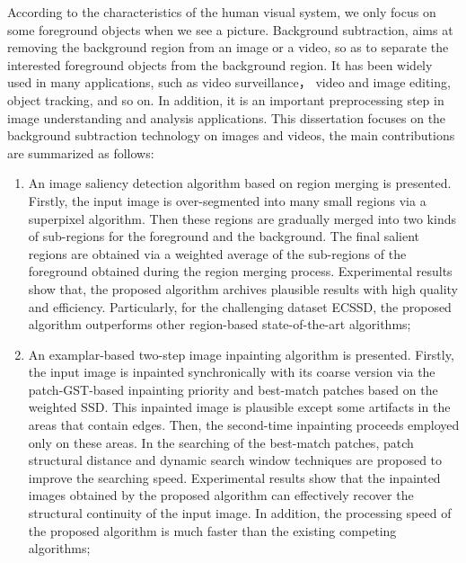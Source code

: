 \begin{eabstract}
   According to the characteristics of the human visual system, we only focus on some foreground objects when we see a picture. Background subtraction, aims at removing the background region from an image or a video, so as to separate the interested foreground objects from the background region. It has been widely used in many applications, such as video surveillance， video and image editing, object tracking, and so on. In addition, it is an important preprocessing step in image  understanding and analysis applications. This dissertation focuses on the background subtraction technology on images and videos, the main contributions are summarized as follows:
   \begin{enumerate}
   \item An image saliency detection algorithm based on region merging is presented. Firstly, the input image is over-segmented into many small regions via a superpixel algorithm. Then these regions are gradually merged into two kinds of sub-regions for the foreground and the background. The final salient regions are obtained via a weighted average of the sub-regions of the  foreground obtained during the region merging process. Experimental results show that, the proposed algorithm archives plausible results with high quality and efficiency. Particularly, for the challenging dataset ECSSD, the proposed algorithm outperforms other region-based state-of-the-art algorithms;
   \item An examplar-based two-step image inpainting algorithm is presented. Firstly, the input image is inpainted synchronically with its coarse version via the patch-GST-based inpainting priority and best-match patches based on the weighted SSD. This inpainted image is plausible except some artifacts in the areas that contain edges. Then, the second-time inpainting proceeds employed only on these areas. In the searching of the best-match patches, patch structural distance and dynamic search window techniques are proposed to improve the searching speed. Experimental results show that the inpainted images obtained by the proposed algorithm can effectively recover the structural continuity of the input image. In addition, the processing speed of the proposed algorithm is much faster than the existing competing algorithms;

\end{enumerate}
\end{eabstract}
